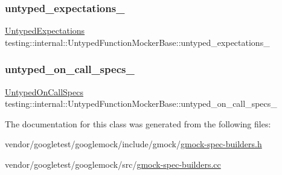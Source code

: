 \mbox{\label{classtesting_1_1internal_1_1_untyped_function_mocker_base_aae4a42a4bace1fcb0cd4bdf1ddd40277}} 
\subsubsection{\texorpdfstring{untyped\+\_\+expectations\+\_\+}{untyped\_expectations\_}}
{\footnotesize\ttfamily \hyperlink{classtesting_1_1internal_1_1_untyped_function_mocker_base_a36480bd395e110b4eae5b0d0402de966}{Untyped\+Expectations} testing\+::internal\+::\+Untyped\+Function\+Mocker\+Base\+::untyped\+\_\+expectations\+\_\+\hspace{0.3cm}{\ttfamily [protected]}}

\mbox{\label{classtesting_1_1internal_1_1_untyped_function_mocker_base_aed2a1913f6c03fd47c8900039556be34}} 
\subsubsection{\texorpdfstring{untyped\+\_\+on\+\_\+call\+\_\+specs\+\_\+}{untyped\_on\_call\_specs\_}}
{\footnotesize\ttfamily \hyperlink{classtesting_1_1internal_1_1_untyped_function_mocker_base_a29cc87ed60ad0218432aa777abba7dbb}{Untyped\+On\+Call\+Specs} testing\+::internal\+::\+Untyped\+Function\+Mocker\+Base\+::untyped\+\_\+on\+\_\+call\+\_\+specs\+\_\+\hspace{0.3cm}{\ttfamily [protected]}}



The documentation for this class was generated from the following files\+:\begin{DoxyCompactItemize}
\item 
vendor/googletest/googlemock/include/gmock/\hyperlink{gmock-spec-builders_8h}{gmock-\/spec-\/builders.\+h}\item 
vendor/googletest/googlemock/src/\hyperlink{gmock-spec-builders_8cc}{gmock-\/spec-\/builders.\+cc}\end{DoxyCompactItemize}
